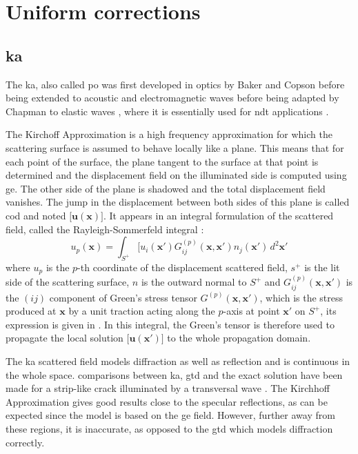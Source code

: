 \section{Uniform corrections}

\subsection{\acrfull{ka}}
The \acrfull{ka}, also called \acrfull{po} was first developed in optics by Baker and Copson \cite{POoptics} before being extended to acoustic and electromagnetic waves \cite{POtechreport, POLewis} before being adapted by Chapman to elastic waves \cite{POChapman}, where it is essentially used for \acrshort{ndt} applications \cite{Schmerr,Dorval}.

The Kirchoff Approximation is a high frequency approximation for which the scattering surface is assumed to behave locally like a plane. This means that for each point of the surface, the plane tangent to the surface at that point is determined and the displacement field on the illuminated side is computed using \acrshort{ge}. The other side of the plane is shadowed and the total displacement field vanishes. The jump in the displacement between both sides of this plane is called \acrfull{cod} and noted $\lbrack \mathbf{u}(\mathbf{x}) \rbrack$. It appears in an integral formulation of the scattered field, called the Rayleigh-Sommerfeld integral \cite{POChapman} :
\begin{equation}
u_p(\mathbf{x})=\int_{S^+}\lbrack u_i(\mathbf{x'})G_{ij}^{(p)}(\mathbf{x},\mathbf{x'})n_j(\mathbf{x'})\,d^2\mathbf{x'}
\label{intKA}
\end{equation}
where $u_p$ is the $p$-th coordinate of the displacement scattered field, $s^+$ is the lit side of the scattering surface, $n$ is the outward normal to $S^+$ and $G_{ij}^{(p)}(\mathbf{x},\mathbf{x'})$ is the $(ij)$ component of Green's stress tensor $G^{(p)}(\mathbf{x},\mathbf{x'})$, which is the stress produced at $\mathbf{x}$ by a unit traction acting along the $p$-axis at point $\mathbf{x'}$ on $S^+$, its expression is given in \cite{POChapman}. In this integral, the Green's tensor is therefore used to propagate the local solution $\lbrack \mathbf{u}(\mathbf{x'}) \rbrack$ to the whole propagation domain.

The \acrshort{ka} scattered field models diffraction as well as reflection and is continuous in the whole space. comparisons between \acrshort{ka}, \acrshort{gtd} and the exact solution have been made for a strip-like crack illuminated by a transversal wave \cite{POChapman,systmodel}. The Kirchhoff Approximation gives good results close to the specular reflections, as can be expected since the model is based on the \acrshort{ge} field. However, further away from these regions, it is inaccurate, as opposed to the \acrshort{gtd} which models diffraction correctly.

